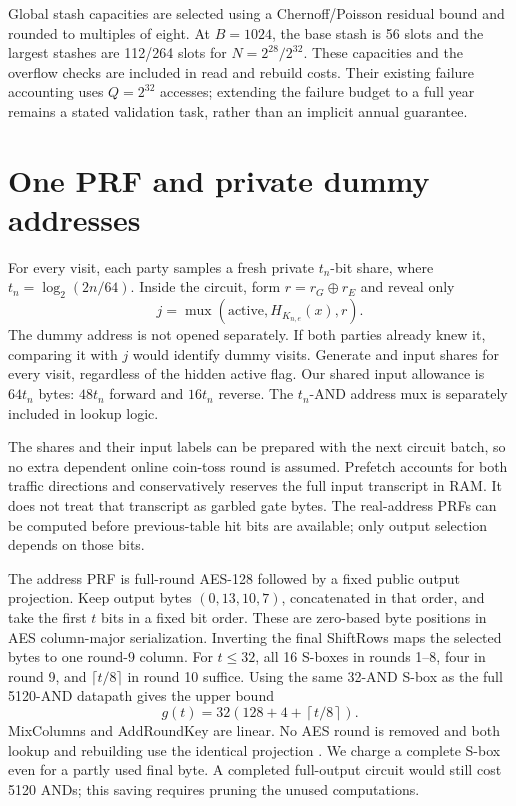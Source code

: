 \documentclass[11pt]{article}
\begin{document}
Global stash capacities are selected using a Chernoff/Poisson residual
bound and rounded to multiples of eight. At $B=1024$, the base stash is
56 slots and the largest stashes are 112/264 slots for $N=2^{28}/2^{32}$.
These capacities and the overflow checks are included in read and rebuild
costs. Their existing failure accounting uses $Q=2^{32}$ accesses;
extending the failure budget to a full year remains a stated validation
task, rather than an implicit annual guarantee.

\section{One PRF and private dummy addresses}
For every visit, each party samples a fresh private $t_n$-bit share,
where $t_n=\log_2(2n/64)$. Inside the circuit, form
$r=r_G\oplus r_E$ and reveal only
\[
 j=\operatorname{mux}(\mathrm{active},H_{K_{n,e}}(x),r).
\]
The dummy address is not opened separately. If both parties already knew
it, comparing it with $j$ would identify dummy visits. Generate and input
shares for every visit, regardless of the hidden active flag. Our shared
input allowance is $64t_n$ bytes: $48t_n$ forward and $16t_n$ reverse.
The $t_n$-AND address mux is separately included in lookup logic.

The shares and their input labels can be prepared with the next circuit
batch, so no extra dependent online coin-toss round is assumed. Prefetch
accounts for both traffic directions and conservatively reserves the full
input transcript in RAM. It does not treat that transcript as garbled
gate bytes. The real-address PRFs can be computed before previous-table
hit bits are available; only output selection depends on those bits.

The address PRF is full-round AES-128 followed by a fixed public output
projection. Keep output bytes $(0,13,10,7)$, concatenated in that order,
and take the first $t$ bits in a fixed bit order. These are zero-based byte
positions in AES column-major serialization. Inverting the final
ShiftRows maps the selected bytes to one round-9 column. For $t\leq32$,
all 16 S-boxes in rounds 1--8, four in round 9, and $\lceil t/8\rceil$
in round 10 suffice. Using the same 32-AND S-box as the full 5120-AND
datapath gives the upper bound
\[
 g(t)=32\left(128+4+\left\lceil t/8\right\rceil\right).
\]
MixColumns and AddRoundKey are linear. No AES round is removed and both
lookup and rebuilding use the identical projection
\cite{nist-fips197,nist-aes}. We charge a complete S-box even for a partly
used final byte. A completed full-output circuit would still cost 5120
ANDs; this saving requires pruning the unused computations.
\end{document}
